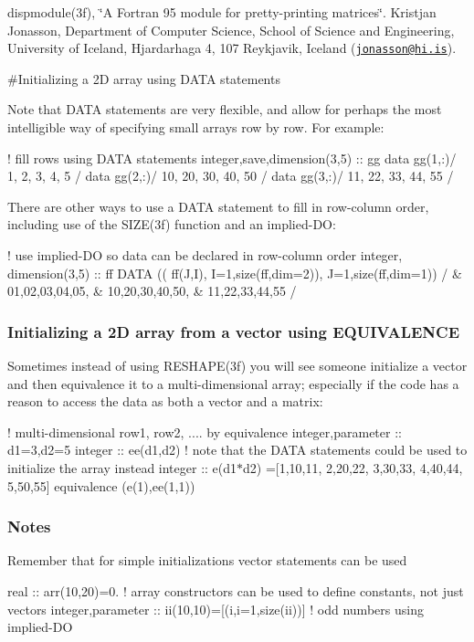 dispmodule(3f), \char`\"{}\+A Fortran 95 module for pretty-\/printing matrices\char`\"{}. Kristjan Jonasson, Department of Computer Science, School of Science and Engineering, University of Iceland, Hjardarhaga 4, 107 Reykjavik, Iceland (\href{mailto:jonasson@hi.is}{\tt jonasson@hi.\+is}).

\#\+Initializing a 2D array using D\+A\+TA statements

Note that D\+A\+TA statements are very flexible, and allow for perhaps the most intelligible way of specifying small arrays row by row. For example\+:

! fill rows using D\+A\+TA statements integer,save,dimension(3,5) \+:\+: gg data gg(1,\+:)/ 1, 2, 3, 4, 5 / data gg(2,\+:)/ 10, 20, 30, 40, 50 / data gg(3,\+:)/ 11, 22, 33, 44, 55 /

There are other ways to use a D\+A\+TA statement to fill in row-\/column order, including use of the S\+I\+Z\+E(3f) function and an implied-\/\+DO\+:

! use implied-\/\+DO so data can be declared in row-\/column order integer, dimension(3,5) \+:\+: ff D\+A\+TA (( ff(\+J,\+I), I=1,size(ff,dim=2)), J=1,size(ff,dim=1)) / \& 01,02,03,04,05, \& 10,20,30,40,50, \& 11,22,33,44,55 /

\subsubsection*{Initializing a 2D array from a vector using E\+Q\+U\+I\+V\+A\+L\+E\+N\+CE}

Sometimes instead of using R\+E\+S\+H\+A\+P\+E(3f) you will see someone initialize a vector and then equivalence it to a multi-\/dimensional array; especially if the code has a reason to access the data as both a vector and a matrix\+:

! multi-\/dimensional row1, row2, .... by equivalence integer,parameter \+:\+: d1=3,d2=5 integer \+:\+: ee(d1,d2) ! note that the D\+A\+TA statements could be used to initialize the array instead integer \+:\+: e(d1$\ast$d2) =\mbox{[}1,10,11, 2,20,22, 3,30,33, 4,40,44, 5,50,55\mbox{]} equivalence (e(1),ee(1,1))

\subsubsection*{Notes}

Remember that for simple initializations vector statements can be used

real \+:\+: arr(10,20)=0. ! array constructors can be used to define constants, not just vectors integer,parameter \+:\+: ii(10,10)=\mbox{[}(i,i=1,size(ii))\mbox{]} ! odd numbers using implied-\/\+DO

